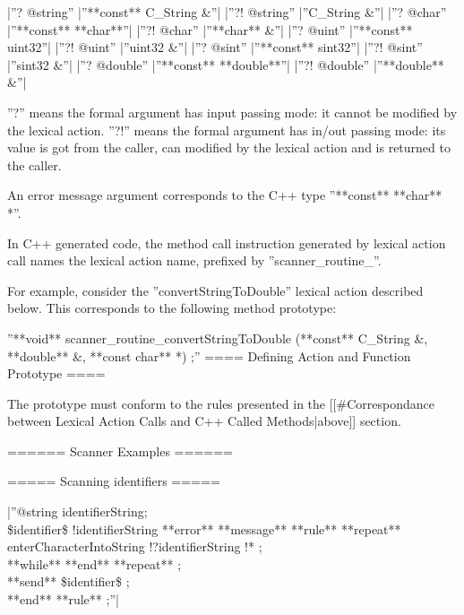 {%
|''? @string''  |''**const** C\_String \&''|
|''?! @string''  |''C\_String \&''|
|''? @char''  |''**const** **char**''|
|''?! @char''  |''**char** \&''|
|''? @uint''  |''**const** uint32''|
|''?! @uint''  |''uint32 \&''|
|''? @sint''  |''**const** sint32''|
|''?! @sint''  |''sint32 \&''|
|''? @double''  |''**const** **double**''|
|''?! @double''  |''**double** \&''|

''?'' means the formal argument has input passing mode: it cannot be modified by the lexical action. ''?!'' means the formal argument has in/out passing mode: its value is got from the caller, can modified by the lexical action and is returned to the caller.

An error message argument corresponds to the C++ type ''**const** **char** *''.

In C++ generated code, the method call instruction generated by lexical action call names the lexical action name, prefixed by ''scanner\_routine\_''.

For example, consider the ''convertStringToDouble'' lexical action described below. This corresponds to the following method prototype:

''**void** scanner\_routine\_convertStringToDouble (**const** C\_String \&, **double** \&, **const char** *) ;''
==== Defining Action and Function Prototype ====

The prototype must conform to the rules presented in the [[\#Correspondance between Lexical Action Calls and C++ Called Methods|above]] section.


====== Scanner Examples ======

===== Scanning identifiers =====

|''@string identifierString;\\ 
\$identifier\$ !identifierString **error** **message** %
**rule** %
 **repeat**\\ 
  enterCharacterIntoString !?identifierString !* ;\\ 
 **while** %
 **end** **repeat** ;\\ 
 **send** \$identifier\$ ;\\
**end** **rule** ;''|

}
